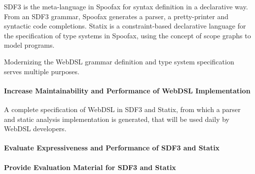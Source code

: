     SDF3 \autocite{VollebregtKV12,AmorimV20} is the meta-language in Spoofax for syntax definition in a declarative way. From an SDF3 grammar, Spoofax generates a parser, a pretty-printer and syntactic code completions. Statix \autocite{VanAntwerpen2018} is a constraint-based declarative language for the specification of type systems in Spoofax, using the concept of scope graphs \autocite{Neron2015} to model programs.

    Modernizing the WebDSL grammar definition and type system specification serves multiple purposes.

    \paragraph{Increase Maintainability and Performance of WebDSL Implementation} A complete specification of WebDSL in SDF3 and Statix, from which a parser and static analysis implementation is generated, that will be used daily by WebDSL developers.

    \paragraph{Evaluate Expressiveness and Performance of SDF3 and Statix}

    \paragraph{Provide Evaluation Material for SDF3 and Statix}
